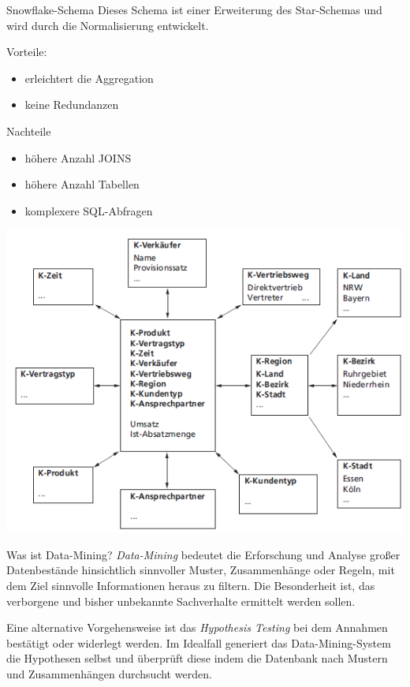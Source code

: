 \documentclass[a6paper,10pt,grid=front%
,toc
]{kartei}
\begin{document}
  \begin{karte}{Snowflake-Schema}  
    Dieses Schema ist einer Erweiterung des Star-Schemas und wird durch die Normalisierung entwickelt.

    Vorteile:
    \begin{itemize}
      \item erleichtert die Aggregation
      \item keine Redundanzen      
    \end{itemize}

    Nachteile

    \begin{itemize}
      \item höhere Anzahl JOINS
      \item höhere Anzahl Tabellen
      \item komplexere SQL-Abfragen
    \end{itemize}

    \includegraphics[height=.45\paperheight]{img/snowflake}
  \end{karte}

  \begin{karte}{Was ist Data-Mining?}
    \textit{Data-Mining} bedeutet die Erforschung und Analyse großer Datenbestände hinsichtlich sinnvoller Muster, Zusammenhänge oder Regeln, mit dem Ziel sinnvolle Informationen heraus zu filtern. Die Besonderheit ist, das verborgene und bisher unbekannte Sachverhalte ermittelt werden sollen.

    Eine alternative Vorgehensweise ist das \textit{Hypothesis Testing} bei dem Annahmen bestätigt oder widerlegt werden. Im Idealfall generiert das Data-Mining-System die Hypothesen selbst und überprüft diese indem die Datenbank nach Mustern und Zusammenhängen durchsucht werden.
  \end{karte}
\end{document}
